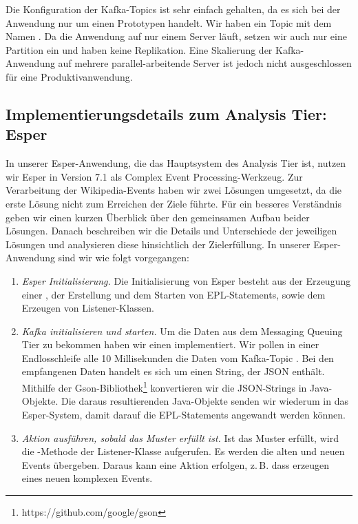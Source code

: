 Die Konfiguration der Kafka-Topics ist sehr einfach gehalten, da es sich bei der Anwendung nur um einen Prototypen handelt.
Wir haben ein Topic mit dem Namen . Da die Anwendung auf nur einem Server läuft, setzen wir auch nur
eine Partition ein und haben keine Replikation. Eine Skalierung der Kafka-Anwendung auf mehrere
parallel-arbeitende Server ist jedoch nicht ausgeschlossen für eine Produktivanwendung.

\subsection{Implementierungsdetails zum Analysis Tier: Esper}
In unserer Esper-Anwendung, die das Hauptsystem des Analysis Tier ist, nutzen wir Esper in Version 7.1
als Complex Event Processing-Werkzeug.
Zur Verarbeitung der Wikipedia-Events haben wir zwei Lösungen umgesetzt, da die erste Lösung nicht
zum Erreichen der Ziele führte. Für ein besseres Verständnis geben wir einen kurzen Überblick über den gemeinsamen Aufbau beider
Lösungen. Danach beschreiben wir die Details und Unterschiede der jeweiligen Lösungen und analysieren diese hinsichtlich der
Zielerfüllung.
In unserer Esper-Anwendung sind wir wie folgt vorgegangen:

\begin{enumerate}
    \item \textit{Esper Initialisierung.} Die Initialisierung von Esper besteht aus der Erzeugung einer ,
    der Erstellung und dem Starten von EPL-Statements, sowie dem Erzeugen von Listener-Klassen.
    \item \textit{Kafka initialisieren und starten.} Um die Daten aus dem Messaging Queuing Tier zu bekommen haben wir einen
     implementiert.
    Wir pollen in einer Endlosschleife alle 10 Millisekunden die Daten vom Kafka-Topic . Bei den empfangenen Daten
    handelt es sich um einen String, der JSON enthält. Mithilfe der Gson-Bibliothek\footnote{https://github.com/google/gson}
    konvertieren wir die JSON-Strings in Java-Objekte. Die daraus resultierenden Java-Objekte senden wir wiederum in das
    Esper-System, damit darauf die EPL-Statements angewandt werden können.
    \item \textit{Aktion ausführen, sobald das Muster erfüllt ist.} Ist das Muster erfüllt, wird die -Methode der Listener-Klasse
    aufgerufen. Es werden die alten und neuen Events übergeben. Daraus kann eine Aktion erfolgen, z.\,B. dass erzeugen eines neuen
    komplexen Events.
\end{enumerate}

